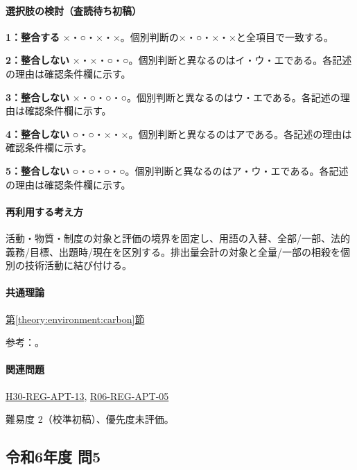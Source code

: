 \paragraph{選択肢の検討（査読待ち初稿）}\mbox{}\par

\noindent\textbf{1：整合する} ×・○・×・×。個別判断の×・○・×・×と全項目で一致する。\par

\noindent\textbf{2：整合しない} ×・×・○・○。個別判断と異なるのはイ・ウ・エである。各記述の理由は確認条件欄に示す。\par

\noindent\textbf{3：整合しない} ×・○・○・○。個別判断と異なるのはウ・エである。各記述の理由は確認条件欄に示す。\par

\noindent\textbf{4：整合しない} ○・○・×・×。個別判断と異なるのはアである。各記述の理由は確認条件欄に示す。\par

\noindent\textbf{5：整合しない} ○・○・○・○。個別判断と異なるのはア・ウ・エである。各記述の理由は確認条件欄に示す。\par

\paragraph{再利用する考え方} 活動・物質・制度の対象と評価の境界を固定し、用語の入替、全部/一部、法的義務/目標、出題時/現在を区別する。排出量会計の対象と全量/一部の相殺を個別の技術活動に結び付ける。

\paragraph{共通理論} \hyperref[theory:environment:carbon]{第\ref*{theory:environment:carbon}節}

\par 参考：\cite{env_kyoto2005,env_offset_guideline,env_neutral2011}。

\paragraph{関連問題} \hyperref[q:h30-reg-apt-13]{H30-REG-APT-13}, \hyperref[q:r06-reg-apt-05]{R06-REG-APT-05}

\par 難易度 2（校準初稿）、優先度未評価。

\subsection{令和6年度 問5}
\label{q:r06-reg-apt-05}

